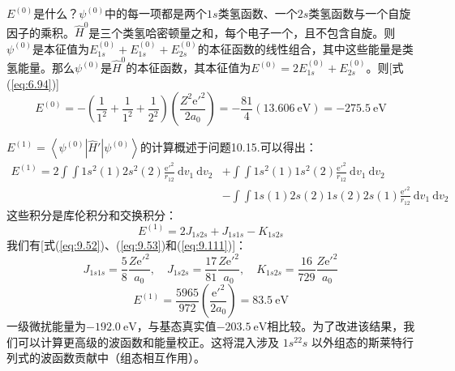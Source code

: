     $E^{\left(0\right)}$是什么？$\psi^{\left(0\right)}$中的每一项都是两个$1s$类氢函数、一个$2s$类氢函数与一个自旋因子的乘积。$\hat{H}^0$是三个类氢哈密顿量之和，每个电子一个，且不包含自旋。则$\psi^{\left(0\right)}$是本征值为$E_{1s}^{\left(0\right)} + E_{1s}^{\left(0\right)} + E_{2s}^{\left(0\right)}$的本征函数的线性组合，其中这些能量是类氢能量。那么$\psi^{\left(0\right)}$是$\hat{H}^0$的本征函数，其本征值为$E^{\left(0\right)} = 2E_{1s}^{\left(0\right)} + E_{2s}^{\left(0\right)}$。则[式(\ref{eq:6.94})]
    \begin{equation}
        E^{\left(0\right)} = -\left(\frac{1}{1^2} + \frac{1}{1^2} + \frac{1}{2^2}\right) \left(\frac{Z^2\mathrm{e}'^2}{2a_0}\right) = -\frac{81}{4}\left(13.606 \: \mathrm{eV} \right) = -275.5 \: \mathrm{eV}
        \label{eq:10.49}
    \end{equation}
    

    $E^{\left(1\right)} = \left\langle \psi^{\left(0\right)} \left| \hat{H}' \right| \psi^{\left(0\right)} \right\rangle$的计算概述于问题10.15.可以得出：
    \begin{equation}
        \begin{aligned}
            E^{\left(1\right)} = 2\int \int 1s^2\left(1\right)2s^2\left(2\right) \frac{\mathrm{e}'^2}{r_{12}} \: \mathrm{d}v_1 \: \mathrm{d}v_2 &+ \int \int 1s^2\left(1\right)1s^2\left(2\right) \frac{\mathrm{e}'^2}{r_{12}} \: \mathrm{d}v_1 \: \mathrm{d}v_2 \\
            &- \int \int 1s\left(1\right)2s\left(2\right)1s\left(2\right)2s\left(1\right) \frac{\mathrm{e}'^2}{r_{12}} \: \mathrm{d}v_1 \: \mathrm{d}v_2
        \end{aligned}
        \label{eq:10.50}
    \end{equation}
    这些积分是库伦积分和交换积分：
    \begin{equation}
        E^{\left(1\right)} = 2J_{1s2s} + J_{1s1s} - K_{1s2s}
        \label{eq:10.51}
    \end{equation}
    我们有[式(\ref{eq:9.52})、(\ref{eq:9.53})和(\ref{eq:9.111})]：
    \begin{equation*}
        J_{1s1s} = \frac{5}{8} \frac{Z\mathrm{e}'^2}{a_0}, \quad J_{1s2s} = \frac{17}{81} \frac{Z\mathrm{e}'^2}{a_0}, \quad K_{1s2s} = \frac{16}{729} \frac{Z\mathrm{e}'^2}{a_0}
    \end{equation*}
    \begin{equation*}
        E^{\left(1\right)} = \frac{5965}{972}\left(\frac{\mathrm{e}'^2}{2a_0}\right) = 83.5 \: \mathrm{eV}
    \end{equation*}
    一级微扰能量为$-192.0 \: \mathrm{eV}$，与基态真实值$-203.5 \: \mathrm{eV}$相比较。为了改进该结果，我们可以计算更高级的波函数和能量校正。这将混入涉及 $1s^22s$ 以外组态的斯莱特行列式的波函数贡献中（组态相互作用）。

